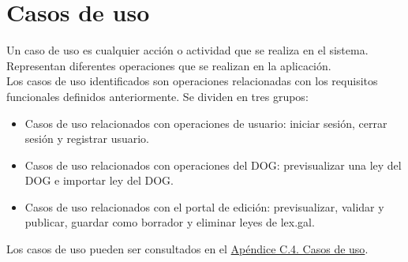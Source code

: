 \section{Casos de uso}

Un caso de uso \cite{casodeuso} es cualquier acción o actividad que se realiza en el sistema. Representan diferentes operaciones que se realizan en la aplicación.
\\

Los casos de uso identificados son operaciones relacionadas con los requisitos funcionales definidos anteriormente. Se dividen en tres grupos: 

\begin{itemize}
    \item Casos de uso relacionados con operaciones de usuario: iniciar sesión, cerrar sesión y registrar usuario.
    \item Casos de uso relacionados con operaciones del DOG: previsualizar una ley del DOG e importar ley del DOG.
    \item Casos de uso relacionados con el portal de edición: previsualizar, validar y publicar, guardar como borrador y eliminar leyes de lex.gal.
\end{itemize}

Los casos de uso pueden ser consultados en el \hyperref[APCasosUso]{Apéndice C.4. Casos de uso}.